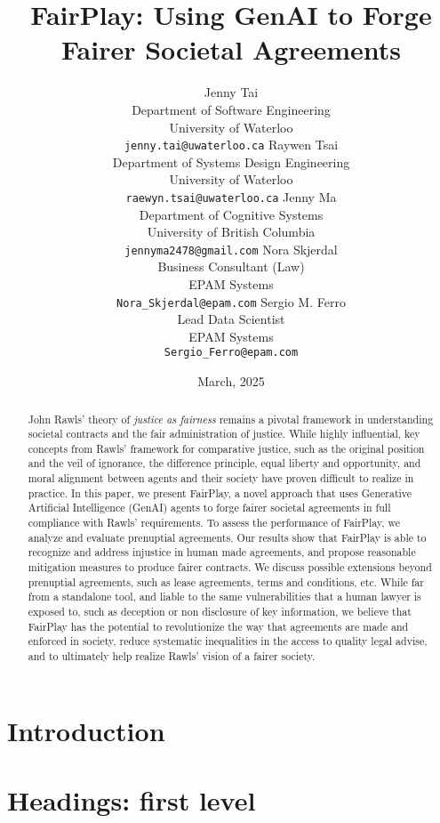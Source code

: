 \documentclass{article}
\title{FairPlay: Using GenAI to Forge Fairer Societal Agreements}
\date{March, 2025}
\author{
  Jenny Tai \\
  Department of Software Engineering \\
  University of Waterloo \\
  \texttt{jenny.tai@uwaterloo.ca}
  \And
  Raywen Tsai \\
  Department of Systems Design Engineering \\
  University of Waterloo \\
  \texttt{raewyn.tsai@uwaterloo.ca}
  \And
  Jenny Ma \\
  Department of Cognitive Systems \\
  University of British Columbia \\
  \texttt{jennyma2478@gmail.com}
  \And
  Nora Skjerdal \\
  Business Consultant (Law) \\
  EPAM Systems \\
  \texttt{Nora\_Skjerdal@epam.com}
  \And
  Sergio M. Ferro \\
  Lead Data Scientist \\
  EPAM Systems \\
  \texttt{Sergio\_Ferro@epam.com}
}
\begin{document}
\maketitle

\begin{abstract}
	John Rawls' theory of \emph{justice as fairness} remains a pivotal framework in understanding societal contracts and the fair 
	administration of justice. While highly influential, key concepts from Rawls' framework for comparative justice, such as the original 
	position and the veil of ignorance, the difference principle, equal liberty and opportunity, and moral alignment between agents 
	and their society have proven difficult to realize in practice.	In this paper, we present FairPlay, a novel approach that uses 
	Generative Artificial Intelligence (GenAI) agents to forge fairer societal agreements in full compliance with Rawls' requirements. 
	To assess the performance of FairPlay, we analyze and evaluate prenuptial agreements. Our results show that FairPlay is able to 
	recognize and address injustice in human made agreements, and propose reasonable mitigation measures to produce fairer contracts. 
	We discuss possible extensions beyond prenuptial agreements, such as lease agreements, terms and conditions, etc. While far from a 
	standalone tool, and liable to the same vulnerabilities that a human lawyer is exposed to, such as deception or non disclosure of 
	key information, we	believe that FairPlay has the potential to revolutionize the way that agreements are made and enforced in society,
	reduce systematic inequalities in the access to quality legal advise, and to ultimately help realize Rawls' vision of a fairer society.
\end{abstract}




\section{Introduction}
\lipsum[2]
\lipsum[3]


\section{Headings: first level}
\label{sec:headings}
\end{document}
